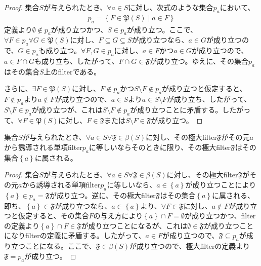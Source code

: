 \documentclass[dvipdfmx]{jsarticle}
\begin{document}
\begin{proof}
集合$S$が与えられたとき、$\forall a \in S$に対し、次式のような集合$p_{a}$において、
\begin{align*}
p_{a} = \left\{ F \in \mathfrak{P}(S) \middle| a \in F \right\}
\end{align*}
定義より$\emptyset \notin p_{a}$が成り立つかつ、$S \in p_{a}$が成り立つ。ここで、$\forall F \in p_{a}\forall G \in \mathfrak{P}(S)$に対し、$F \subseteq G \subseteq S$が成り立つなら、$a \in G$が成り立つので、$G \in p_{a}$も成り立つ。$\forall F,G \in p_{a}$に対し、$a \in F$かつ$a \in G$が成り立つので、$a \in F \cap G$も成り立ち、したがって、$F \cap G \in \mathfrak{F}$が成り立つ。ゆえに、その集合$p_{a}$はその集合$S$上のfilterである。\par
さらに、$\exists F \in \mathfrak{P}(S)$に対し、$F \notin p_{a}$かつ$S \setminus F \notin p_{a}$が成り立つと仮定すると、$F \notin p_{a}$より$a \notin F$が成り立つので、$a \in S$より$a \in S \setminus F$が成り立ち、したがって、$S \setminus F \in p_{a}$が成り立つが、これは$S \setminus F \notin p_{a}$が成り立つことに矛盾する。したがって、$\forall F \in \mathfrak{P}(S)$に対し、$F \in \mathfrak{F}$または$S \setminus F \in \mathfrak{F}$が成り立つ。
\end{proof}
\begin{thm}\label{8.1.8.9}
集合$S$が与えられたとき、$\forall a \in S\forall\mathfrak{F \in}\beta(S)$に対し、その極大filter$\mathfrak{F}$がその元$a$から誘導される単項filter$p_{a}$に等しいならそのときに限り、その極大filter$\mathfrak{F}$はその集合$\left\{ a \right\}$に属される。
\end{thm}
\begin{proof}
集合$S$が与えられたとき、$\forall a \in S\forall\mathfrak{F \in}\beta(S)$に対し、その極大filter$\mathfrak{F}$がその元$a$から誘導される単項filter$p_{a}$に等しいなら、$a \in \left\{ a \right\}$が成り立つことにより$\left\{ a \right\} \in p_{a} = \mathfrak{F}$が成り立つ。逆に、その極大filter$\mathfrak{F}$はその集合$\left\{ a \right\}$に属される、即ち、$\left\{ a \right\}\in \mathfrak{F}$が成り立つなら、$a \in \left\{ a \right\}$より、$\forall F \in \mathfrak{F}$に対し、$a \notin F$が成り立つと仮定すると、その集合$F$の与え方により$\left\{ a \right\} \cap F = \emptyset$が成り立つかつ、filterの定義より$\left\{ a \right\} \cap F \in \mathfrak{F}$が成り立つことになるが、これは$\emptyset \in \mathfrak{F}$が成り立つことになりfilterの定義に矛盾する。したがって、$a \in F$が成り立つので、$\mathfrak{F \subseteq}p_{a}$が成り立つことになる。ここで、$\mathfrak{F}\in \beta(S)$が成り立つので、極大filterの定義より$\mathfrak{F} = p_{a}$が成り立つ。
\end{proof}
\end{document}
